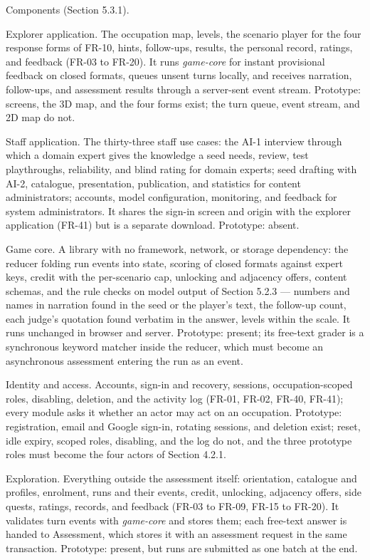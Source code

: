 Components (Section 5.3.1).

Explorer application. The occupation map, levels, the scenario player for the four response forms of FR-10, hints, follow-ups, results, the personal record, ratings, and feedback (FR-03 to FR-20). It runs \textit{game-core} for instant provisional feedback on closed formats, queues unsent turns locally, and receives narration, follow-ups, and assessment results through a server-sent event stream. Prototype: screens, the 3D map, and the four forms exist; the turn queue, event stream, and 2D map do not.

Staff application. The thirty-\allowbreak{}three staff use cases: the AI-1 interview through which a domain expert gives the knowledge a seed needs, review, test playthroughs, reliability, and blind rating for domain experts; seed drafting with AI-2, catalogue, presentation, publication, and statistics for content administrators; accounts, model configuration, monitoring, and feedback for system administrators. It shares the sign-in screen and origin with the explorer application (FR-41) but is a separate download. Prototype: absent.

Game core. A library with no framework, network, or storage dependency: the reducer folding run events into state, scoring of closed formats against expert keys, credit with the per-\allowbreak{}scenario cap, unlocking and adjacency offers, content schemas, and the rule checks on model output of Section 5.2.3 --- numbers and names in narration found in the seed or the player's text, the follow-up count, each judge's quotation found verbatim in the answer, levels within the scale. It runs unchanged in browser and server. Prototype: present; its free-text grader is a synchronous keyword matcher inside the reducer, which must become an asynchronous assessment entering the run as an event.

Identity and access. Accounts, sign-in and recovery, sessions, occupation-\allowbreak{}scoped roles, disabling, deletion, and the activity log (FR-01, FR-02, FR-40, FR-41); every module asks it whether an actor may act on an occupation. Prototype: registration, email and Google sign-in, rotating sessions, and deletion exist; reset, idle expiry, scoped roles, disabling, and the log do not, and the three prototype roles must become the four actors of Section 4.2.1.

Exploration. Everything outside the assessment itself: orientation, catalogue and profiles, enrolment, runs and their events, credit, unlocking, adjacency offers, side quests, ratings, records, and feedback (FR-03 to FR-09, FR-15 to FR-20). It validates turn events with \textit{game-core} and stores them; each free-text answer is handed to Assessment, which stores it with an assessment request in the same transaction. Prototype: present, but runs are submitted as one batch at the end.


